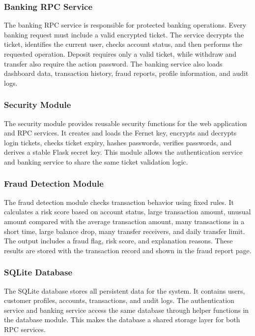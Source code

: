 \documentclass[12pt,a4paper]{article}
\begin{document}
\subsubsection{Banking RPC Service}

The banking RPC service is responsible for protected banking operations. Every banking request must include a valid encrypted ticket. The service decrypts the ticket, identifies the current user, checks account status, and then performs the requested operation. Deposit requires only a valid ticket, while withdraw and transfer also require the action password. The banking service also loads dashboard data, transaction history, fraud reports, profile information, and audit logs.

\subsubsection{Security Module}

The security module provides reusable security functions for the web application and RPC services. It creates and loads the Fernet key, encrypts and decrypts login tickets, checks ticket expiry, hashes passwords, verifies passwords, and derives a stable Flask secret key. This module allows the authentication service and banking service to share the same ticket validation logic.

\subsubsection{Fraud Detection Module}

The fraud detection module checks transaction behavior using fixed rules. It calculates a risk score based on account status, large transaction amount, unusual amount compared with the average transaction amount, many transactions in a short time, large balance drop, many transfer receivers, and daily transfer limit. The output includes a fraud flag, risk score, and explanation reasons. These results are stored with the transaction record and shown in the fraud report page.

\subsubsection{SQLite Database}

The SQLite database stores all persistent data for the system. It contains users, customer profiles, accounts, transactions, and audit logs. The authentication service and banking service access the same database through helper functions in the database module. This makes the database a shared storage layer for both RPC services.
\end{document}
